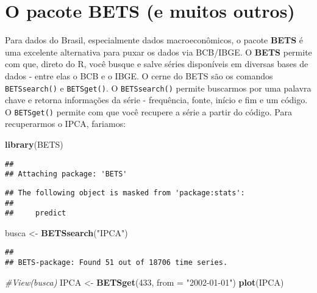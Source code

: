\documentclass[]{book}
\newenvironment{Shaded}{\begin{snugshade}}{\end{snugshade}}
\newcommand{\KeywordTok}[1]{\textcolor[rgb]{0.13,0.29,0.53}{\textbf{#1}}}
\newcommand{\DataTypeTok}[1]{\textcolor[rgb]{0.13,0.29,0.53}{#1}}
\newcommand{\DecValTok}[1]{\textcolor[rgb]{0.00,0.00,0.81}{#1}}
\newcommand{\StringTok}[1]{\textcolor[rgb]{0.31,0.60,0.02}{#1}}
\newcommand{\CommentTok}[1]{\textcolor[rgb]{0.56,0.35,0.01}{\textit{#1}}}
\newcommand{\NormalTok}[1]{#1}
\begin{document}
\section{O pacote BETS (e muitos
outros)}\label{o-pacote-bets-e-muitos-outros}

Para dados do Brasil, especialmente dados macroeconômicos, o pacote
\textbf{BETS} é uma excelente alternativa para puxar os dados via
BCB/IBGE. O \textbf{BETS} permite com que, direto do R, você busque e
salve séries disponíveis em diversas bases de dados - entre elas o BCB e
o IBGE. O cerne do BETS são os comandos \texttt{BETSsearch()} e
\texttt{BETSget()}. O \texttt{BETSsearch()} permite buscarmos por uma
palavra chave e retorna informações da série - frequência, fonte, início
e fim e um código. O \texttt{BETSget()} permite com que você recupere a
série a partir do código. Para recuperarmos o IPCA, fariamos:

\begin{Shaded}
\begin{Highlighting}[]
\KeywordTok{library}\NormalTok{(BETS)}
\end{Highlighting}
\end{Shaded}

\begin{verbatim}
## 
## Attaching package: 'BETS'
\end{verbatim}

\begin{verbatim}
## The following object is masked from 'package:stats':
## 
##     predict
\end{verbatim}

\begin{Shaded}
\begin{Highlighting}[]
\NormalTok{busca <-}\StringTok{ }\KeywordTok{BETSsearch}\NormalTok{(}\StringTok{"IPCA"}\NormalTok{)}
\end{Highlighting}
\end{Shaded}

\begin{verbatim}
## 
## BETS-package: Found 51 out of 18706 time series.
\end{verbatim}

\begin{Shaded}
\begin{Highlighting}[]
\CommentTok{#View(busca)}
\NormalTok{IPCA <-}\StringTok{ }\KeywordTok{BETSget}\NormalTok{(}\DecValTok{433}\NormalTok{, }\DataTypeTok{from =} \StringTok{"2002-01-01"}\NormalTok{)}
\KeywordTok{plot}\NormalTok{(IPCA)}
\end{Highlighting}
\end{Shaded}
\end{document}
